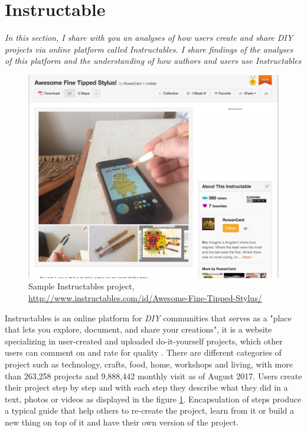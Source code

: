 \section{Instructable}


\begin{center}
	\begin{minipage}{.7\textwidth}
		\textit{In this section, I share with you an analyses of how users create and share \textit{DIY} projects via online platform called Instructables. I share findings of the analyses of this platform and the understanding of how authors and users use Instructables}
	\end{minipage}
\end{center}

\begin{figure}[ht!]
	\includegraphics[scale=0.36]{./images/img-instructables.png}
	\caption{Sample Instructables project, \url{http://www.instructables.com/id/Awesome-Fine-Tipped-Stylus/}}
	\label{fig:sipillustration}
\end{figure}

Instructables is an online platform for \textit{DIY} communities that serves as a "place that lets you explore, document, and share your creations", it is a website specializing in user-created and uploaded do-it-yourself projects, which other users can comment on and rate for quality \cite{wiki:instructable}. There are different categories of project such as technology, crafts, food, home, workshops and living, with more than 263,258 projects and 9,888,442 monthly visit as of August 2017. Users create their project step by step and with each step they describe what they did in a text, photos or videos as displayed in the figure \ref{fig:sipillustration}.  Encapsulation of steps produce a typical guide that help others to re-create the project, learn from it or build a new thing on top of it and have their own version of the project. 

